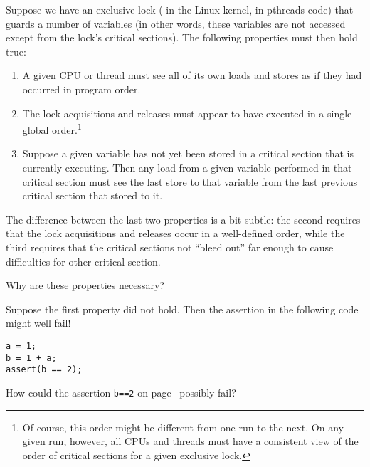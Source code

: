 Suppose we have an exclusive lock ( in the Linux
kernel,  in pthreads code) that guards a number
of variables (in other words, these variables are not accessed except
from the lock's critical sections).
The following properties must then hold true:
\begin{enumerate}
\item	A given CPU or thread must see all of its own loads and stores
	as if they had occurred in program order.
\item	The lock acquisitions and releases must appear to have executed
	in a single global order.\footnote{
		Of course, this order might be different from one run
		to the next.
		On any given run, however, all CPUs and threads must
		have a consistent view of the order of critical sections
		for a given exclusive lock.}
\item	Suppose a given variable has not yet been stored in a
	critical section that is currently executing.
	Then any load from a given variable performed in that critical section
	must see the last store to that variable from the last previous
	critical section that stored to it.
\end{enumerate}

The difference between the last two properties is a bit subtle:
the second requires that the lock acquisitions and releases occur
in a well-defined order, while the third requires that the critical
sections not ``bleed out'' far enough to cause difficulties for
other critical section.

Why are these properties necessary?

Suppose the first property did not hold.
Then the assertion in the following code might well fail!

\vspace{5pt}
\begin{minipage}[t]{\columnwidth}
\scriptsize
\begin{verbatim}
a = 1;
b = 1 + a;
assert(b == 2);
\end{verbatim}
\end{minipage}
\label{codesample:advsync:What Can You Count On? 1}
\vspace{5pt}

\QuickQuiz{}
	How could the assertion {\tt b==2} on
	page~\pageref{codesample:advsync:What Can You Count On? 1}
	possibly fail?
 \QuickQuizEnd

